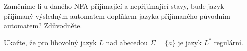 \documentclass[a4paper,12pt]{amsart}
\begin{document}
\medskip\begin{problem}        
    Zaměníme-li u daného NFA přijímající a nepřijímající stavy, bude jazyk přijímaný výsledným automatem doplňkem jazyka přijímaného původním automatem? Zdůvodněte.        
\end{problem}

\medskip\begin{problem}  
    
    Ukažte, že pro libovolný jazyk $L$ nad abecedou $\Sigma=\{a\}$ je jazyk $L^*$ regulární.


\end{problem}

   
\end{document}
